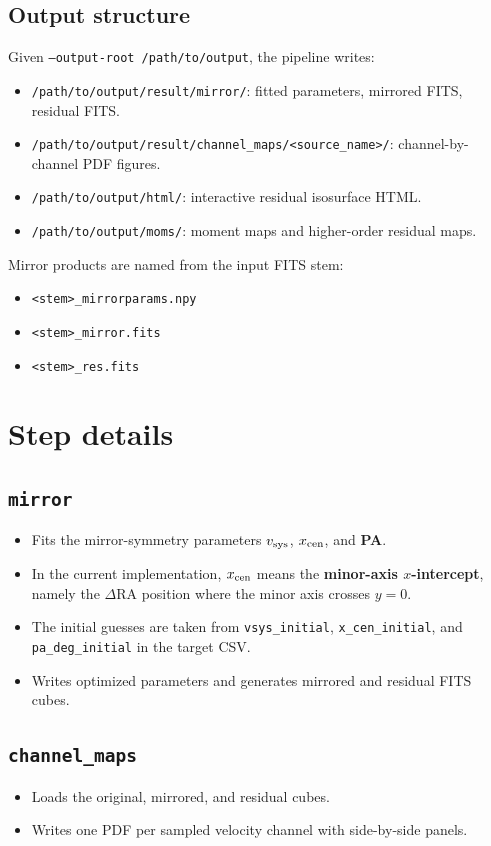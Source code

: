 \documentclass{report}
\begin{document}
\subsection{Output structure}
Given \texttt{--output-root /path/to/output}, the pipeline writes:
\begin{itemize}
    \item \texttt{/path/to/output/result/mirror/}: fitted parameters, mirrored FITS, residual FITS.
    \item \texttt{/path/to/output/result/channel\_maps/<source\_name>/}: channel-by-channel PDF figures.
    \item \texttt{/path/to/output/html/}: interactive residual isosurface HTML.
    \item \texttt{/path/to/output/moms/}: moment maps and higher-order residual maps.
\end{itemize}

Mirror products are named from the input FITS stem:
\begin{itemize}
    \item \texttt{<stem>\_mirrorparams.npy}
    \item \texttt{<stem>\_mirror.fits}
    \item \texttt{<stem>\_res.fits}
\end{itemize}

\section{Step details}
\subsection{\texttt{mirror}}
\begin{itemize}
    \item Fits the mirror-symmetry parameters \textbf{$v_{\rm sys}$}, \textbf{$x_{\rm cen}$}, and \textbf{PA}.
    \item In the current implementation, $x_{\rm cen}$ means the \textbf{minor-axis $x$-intercept}, namely the $\Delta$RA position where the minor axis crosses $y=0$.
    \item The initial guesses are taken from \texttt{vsys\_initial}, \texttt{x\_cen\_initial}, and \texttt{pa\_deg\_initial} in the target CSV.
    \item Writes optimized parameters and generates mirrored and residual FITS cubes.
\end{itemize}

\subsection{\texttt{channel\_maps}}
\begin{itemize}
    \item Loads the original, mirrored, and residual cubes.
    \item Writes one PDF per sampled velocity channel with side-by-side panels.
\end{itemize}
\end{document}
